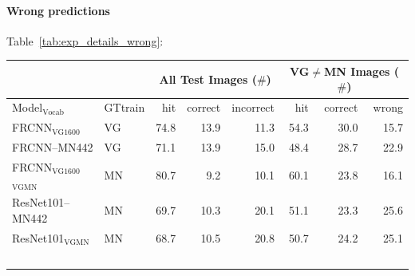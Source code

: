 \paragraph{Wrong predictions}

Table\ \ref{tab:exp_details_wrong}: 

\begin{table}[t]
	\centering
	\small
	\begin{tabular}{l|l|r@{~}r@{~}r@{~}||r@{~}r@{~}r@{~}}
		\toprule
		& & \multicolumn{3}{c}{All Test Images ($\#$)} 
		& \multicolumn{3}{c}{VG$\neq$MN Images ($\#$)}\\
	\toprule
	Model$_{\text{Vocab}}$	& GTtrain  
	&  hit &  correct &  incorrect &  hit &  correct &  wrong \\
	\midrule
	FRCNN$_{\text{VG1600}}$ & VG           &         74.8 &                  13.9 &                    11.3 &         54.3 &                  30.0 &                    15.7 \\
	FRCNN--MN442 & VG &         71.1 &                  13.9 &                    15.0 &         48.4 &                  28.7 &                    22.9 \\
	\midrule \midrule
	FRCNN$_{\text{VG1600}}$$_{\text{VGMN}}$ & MN %
	 &         80.7 &                   9.2 &                    10.1 &         60.1 &                  23.8 &                    16.1 \\
	\midrule
	ResNet101--MN442 & MN %
	 &         69.7 &                  10.3 &                    20.1 &         51.1 &                  23.3 &                    25.6 \\
	ResNet101$_{\text{VGMN}}$ & MN%
	 &         68.7 &                  10.5 &                    20.8 &         50.7 &                  24.2 &                    25.1 \\
$$
\end{tabular}
\end{table}
